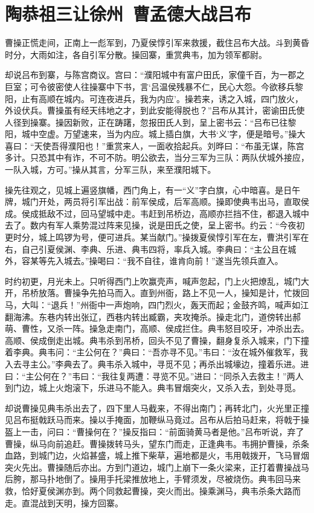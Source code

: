 \chapter{陶恭祖三让徐州~曹孟德大战吕布}

曹操正慌走间，正南上一彪军到，乃夏侯惇引军来救援，截住吕布大战。斗到黄昏时分，大雨如注，各自引军分散。操回寨，重赏典韦，加为领军都尉。

却说吕布到寨，与陈宫商议。宫曰：“濮阳城中有富户田氏，家僮千百，为一郡之巨室；可令彼密使人往操寨中下书，言‘吕温侯残暴不仁，民心大怨。今欲移兵黎阳，止有高顺在城内。可连夜进兵，我为内应’。操若来，诱之入城，四门放火，外设伏兵。曹操虽有经天纬地之才，到此安能得脱也？”吕布从其计，密谕田氏使人径到操寨。操因新败，正在踌躇，忽报田氏人到，呈上密书云：“吕布已往黎阳，城中空虚。万望速来，当为内应。城上插白旗，大书‘义’字，便是暗号。”操大喜曰：“天使吾得濮阳也！”重赏来人，一面收拾起兵。刘晔曰：“布虽无谋，陈宫多计。只恐其中有诈，不可不防。明公欲去，当分三军为三队：两队伏城外接应，一队入城，方可。”操从其言，分军三队，来至濮阳城下。

操先往观之，见城上遍竖旗幡，西门角上，有一“义”字白旗，心中暗喜。是日午牌，城门开处，两员将引军出战：前军侯成，后军高顺。操即使典韦出马，直取侯成。侯成抵敌不过，回马望城中走。韦赶到吊桥边，高顺亦拦挡不住，都退入城中去了。数内有军人乘势混过阵来见操，说是田氏之使，呈上密书。约云：“今夜初更时分，城上鸣锣为号，便可进兵。某当献门。”操拨夏侯惇引军在左，曹洪引军在右，自己引夏侯渊、李典、乐进、典韦四将，率兵入城。李典曰：“主公且在城外，容某等先入城去。”操喝曰：“我不自往，谁肯向前！”遂当先领兵直入。

时约初更，月光未上。只听得西门上吹赢壳声，喊声忽起，门上火把燎乱，城门大开，吊桥放落。曹操争先拍马而入。直到州衙，路上不见一人，操知是计，忙拨回马，大叫：“退兵！”州衙中一声炮响，四门烈火，轰天而起；金鼓齐鸣，喊声如江翻海沸。东巷内转出张辽，西巷内转出臧霸，夹攻掩杀。操走北门，道傍转出郝萌、曹性，又杀一阵。操急走南门，高顺、侯成拦住。典韦怒目咬牙，冲杀出去。高顺、侯成倒走出城。典韦杀到吊桥，回头不见了曹操，翻身复杀入城来，门下撞着李典。典韦问：“主公何在？”典曰：“吾亦寻不见。”韦曰：“汝在城外催救军，我入去寻主公。”李典去了。典韦杀入城中，寻觅不见；再杀出城壕边，撞着乐进。进曰：“主公何在？”韦曰：“我往复两遭：寻览不见。”进曰：“同杀入去救主！”两人到门边，城上火炮滚下，乐进马不能入。典韦冒烟突火，又杀入去，到处寻觅。

却说曹操见典韦杀出去了，四下里人马截来，不得出南门；再转北门，火光里正撞见吕布挺戟跃马而来。操以手掩面，加鞭纵马竟过。吕布从后拍马赶来，将戟于操盔上一击，问曰：“曹操何在？”操反指曰：“前面骑黄马者是他。”吕布听说，弃了曹操，纵马向前追赶。曹操拨转马头，望东门而走，正逢典韦。韦拥护曹操，杀条血路，到城门边，火焰甚盛，城上推下柴草，遍地都是火，韦用戟拨开，飞马冒烟突火先出。曹操随后亦出。方到门道边，城门上崩下一条火梁来，正打着曹操战马后胯，那马扑地倒了。操用手托梁推放地上，手臂须发，尽被烧伤。典韦回马来救，恰好夏侯渊亦到。两个同救起曹操，突火而出。操乘渊马，典韦杀条大路而走。直混战到天明，操方回寨。

